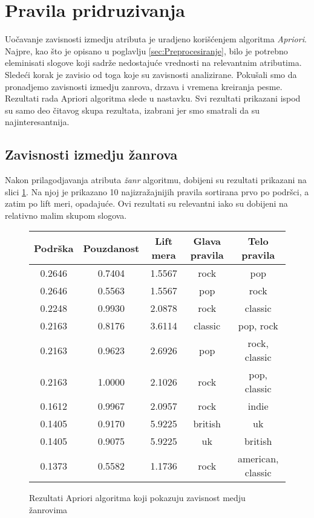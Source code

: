 \section{Pravila pridruzivanja}
\label{sec:PravilaPridruzivanja}

Uo\v{c}avanje zavisnosti izmedju atributa je uradjeno kori\v{s}\'c{}enjem algoritma \emph{Apriori}. Najpre, kao \v{s}to je opisano u poglavlju \ref{sec:Preprocesiranje}, bilo je potrebno eleminisati slogove koji sadr\v{z}e nedostaju\'c{}e vrednosti na relevantnim atributima. Slede\'c{}i korak je zavisio od toga koje su zavisnosti analizirane. Poku\v{s}ali smo da pronadjemo zavisnosti izmedju zanrova, drzava i vremena kreiranja pesme. Rezultati rada Apriori algoritma slede u nastavku. Svi rezultati prikazani ispod su samo deo \v{c}itavog skupa rezultata, izabrani jer smo smatrali da su najinteresantnija.


\subsection{Zavisnosti izmedju \v{z}anrova}
\label{subsec:AprioriZavisnostZanrova}

Nakon prilagodjavanja atributa \emph{\v{z}anr} algoritmu, dobijeni su rezultati prikazani na slici \ref{fig:aprioriZanrovi}. Na njoj je prikazano 10 najizra\v{z}ajnijih pravila sortirana prvo po podr\v{s}ci, a zatim po lift meri, opadaju\'c{}e.
Ovi rezultati su relevantni iako su dobijeni na relativno malim skupom slogova.

\begin{figure}[H]
    \footnotesize
    \centering
    \begin{tabular}{|c|c|c|c|c|}
        \hline
        Podr\v{s}ka & Pouzdanost & Lift mera & Glava pravila & Telo pravila \\
        \hline
        0.2646 & 0.7404 & 1.5567 & rock & pop \\
        0.2646 & 0.5563 & 1.5567 & pop & rock \\
        0.2248 & 0.9930 & 2.0878 & rock & classic \\
        0.2163 & 0.8176 & 3.6114 & classic & pop, rock \\
        0.2163 & 0.9623 & 2.6926 & pop & rock, classic \\
        0.2163 & 1.0000 & 2.1026 & rock & pop, classic \\
        0.1612 & 0.9967 & 2.0957 & rock & indie \\
        0.1405 & 0.9170 & 5.9225 & british & uk \\
        0.1405 & 0.9075 & 5.9225 & uk & british \\
        0.1373 & 0.5582 & 1.1736 & rock & american, classic \\
        \hline
    \end{tabular}
    \caption{Rezultati Apriori algoritma koji pokazuju zavisnost medju \v{z}anrovima}
    \label{fig:aprioriZanrovi}
\end{figure}


